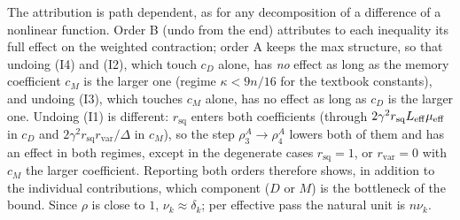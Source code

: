 \begin{remark}\label{rem:B3-orders}
The attribution is path dependent, as for any decomposition of a difference of a nonlinear function. Order B (undo from the end) attributes to each inequality its full effect on the weighted contraction; order A keeps the max structure, so that undoing (I4) and (I2), which touch $c_D$ alone, has \emph{no} effect as long as the memory coefficient $c_M$ is the larger one (regime $\kappa<9n/16$ for the textbook constants), and undoing (I3), which touches $c_M$ alone, has no effect as long as $c_D$ is the larger one. Undoing (I1) is different: $r_{\mathrm{sq}}$ enters both coefficients (through $2\gamma^2r_{\mathrm{sq}}L_{\mathrm{eff}}\mu_{\mathrm{eff}}$ in $c_D$ and $2\gamma^2r_{\mathrm{sq}}r_{\mathrm{var}}/\Delta$ in $c_M$), so the step $\rho^A_3\to\rho^A_4$ lowers both of them and has an effect in both regimes, except in the degenerate cases $r_{\mathrm{sq}}=1$, or $r_{\mathrm{var}}=0$ with $c_M$ the larger coefficient. Reporting both orders therefore shows, in addition to the individual contributions, which component ($D$ or $M$) is the bottleneck of the bound. Since $\rho$ is close to $1$, $\nu_k\approx\delta_k$; per effective pass the natural unit is $n\nu_k$.
\end{remark}


